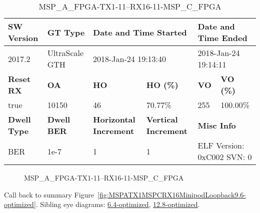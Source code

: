 \begin{table}[h]
\centering
\caption{MSP\_A\_FPGA-TX1-11--RX16-11-MSP\_C\_FPGA}
\label{tab:MSPAFPGATX111RX1611MSPCFPGA9.6-optimized}
\begin{tabular}{@{}|l|l|l|l|l|l|@{}}
\toprule
\textbf{SW Version}                & \textbf{GT Type}   & \multicolumn{2}{l|}{\textbf{Date and Time Started}}            & \multicolumn{2}{l|}{\textbf{Date and Time Ended}}        \\ \midrule
2017.2                       & UltraScale GTH          & \multicolumn{2}{l|}{2018-Jan-24 19:13:40}                   & \multicolumn{2}{l|}{2018-Jan-24 19:14:11}               \\ \midrule
\textbf{Reset RX}                  & \textbf{OA} & \textbf{HO}   & \textbf{HO (\%)} & \textbf{VO} & \textbf{VO (\%)} \\ \midrule
true & 10150        & 46          & 70.77\%        & 255        & 100.00\%       \\ \midrule
\textbf{Dwell Type}                & \textbf{Dwell BER} & \textbf{Horizontal Increment} & \textbf{Vertical Increment}    & \multicolumn{2}{l|}{\textbf{Misc Info}}                  \\ \midrule
BER                            & 1e-7        & 1        & 1           & \multicolumn{2}{l|}{ELF Version: 0xC002 SVN: 0}                         \\ \bottomrule
\end{tabular}
\end{table}

\begin{figure}[h]
\caption{MSP\_A\_FPGA-TX1-11--RX16-11-MSP\_C\_FPGA} \label{fig:MSPAFPGATX111RX1611MSPCFPGA9.6-optimized}
\end{figure}

Call back to summary Figure~\ref{fig:MSPATX1MSPCRX16MinipodLoopback9.6-optimized}.
Sibling eye diagrams: \hyperref[sec:MSPAFPGATX111RX1611MSPCFPGA6.4-optimized]{6.4-optimized}, \hyperref[sec:MSPAFPGATX111RX1611MSPCFPGA12.8-optimized]{12.8-optimized}.

\clearpage
\newpage


